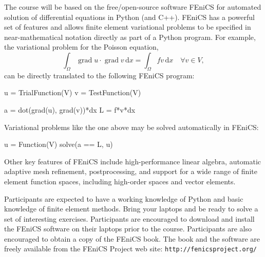 \documentclass[10pt]{article}
\newcommand{\dx}{\,\mathrm{d}x}
\DeclareMathOperator{\grad}{\mathrm{grad}}
\begin{document}
The course will be based on the free/open-source software FEniCS for
automated solution of differential equations in Python (and
C++). FEniCS has a powerful set of features and allows finite element
variational problems to be specified in near-mathematical notation
directly as part of a Python program. For example, the variational
problem for the Poisson equation,
\begin{equation}
  \int_{\Omega} \grad u \cdot \grad v \dx = \int_{\Omega} f v \dx
  \quad \forall v \in V,
\end{equation}
can be directly translated to the following FEniCS program:
\begin{python}
u = TrialFunction(V)
v = TestFunction(V)

a = dot(grad(u), grad(v))*dx
L = f*v*dx
\end{python}
Variational problems like the one above may be solved automatically in
FEniCS:
\begin{python}
u = Function(V)
solve(a == L, u)
\end{python}
Other key features of FEniCS include high-performance linear algebra,
automatic adaptive mesh refinement, postprocessing, and support for a
wide range of finite element function spaces, including high-order
spaces and vector elements.

Participants are expected to have a working knowledge of Python and
basic knowledge of finite element methods. Bring your laptops and be
ready to solve a set of interesting exercises.  Participants are
encouraged to download and install the FEniCS software on their
laptops prior to the course. Participants are also encouraged to
obtain a copy of the FEniCS book. The book and the software are freely
available from the FEniCS Project web site:
\texttt{http://fenicsproject.org/}
\end{document}
